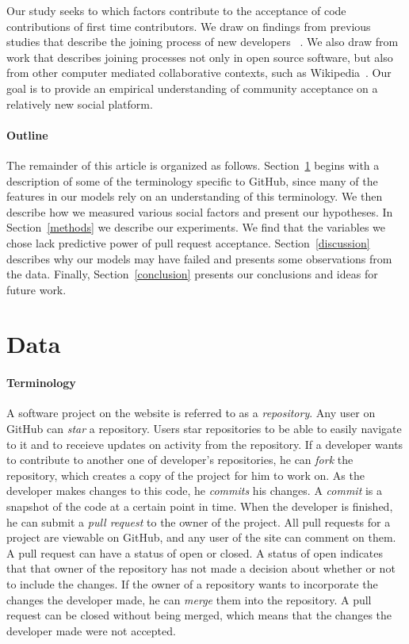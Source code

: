 \documentclass[12pt]{article}
\begin{document}
Our study seeks to which factors contribute to the acceptance of code
contributions of first time contributors. We draw on findings from previous
studies that describe the joining process of new developers
~\cite{huang_mining_2005}\cite{von_krogh_community_2003}. We also draw from work
that describes joining processes not only in open source software, but also from
other computer mediated collaborative contexts, such as
Wikipedia~\cite{bryant_becoming_2005}. Our goal is to provide an empirical
understanding of community acceptance on a relatively new social platform.



\paragraph{Outline}
The remainder of this article is organized as follows.
Section~\ref{data} begins with a description of some of the terminology specific
to GitHub, since many of the features in our models rely on an understanding of
this terminology. We then describe how we measured various social factors and
present our hypotheses. In Section~\ref{methods} we describe our experiments. We
find that the variables we chose lack predictive power of pull request
acceptance. Section~\ref{discussion} describes why our models may have failed
and presents some observations from the data. Finally, Section~\ref{conclusion}
presents our conclusions and ideas for future work.

\section{Data}\label{data}

\paragraph{Terminology} A software project on the website is referred to as a
\textit{repository}. Any user on GitHub can \textit{star} a repository. Users
star repositories to be able to easily navigate to it and to receieve updates on
activity from the repository. If a developer wants to contribute to another one
of developer's repositories, he can \textit{fork} the repository, which creates
a copy of the project for him to work on. As the developer makes changes to this
code, he \textit{commits} his changes. A \textit{commit} is a snapshot of the
code at a certain point in time. When the developer is finished, he can submit a
\textit{pull request} to the owner of the project. All pull requests for a
project are viewable on GitHub, and any user of the site can comment on them. A
pull request can have a status of open or closed. A status of open indicates
that that owner of the repository has not made a decision about whether or not
to include the changes. If the owner of a repository wants to incorporate the
changes the developer made, he can \textit{merge} them into the repository. A
pull request can be closed without being merged, which means that the changes
the developer made were not accepted.
\end{document}
